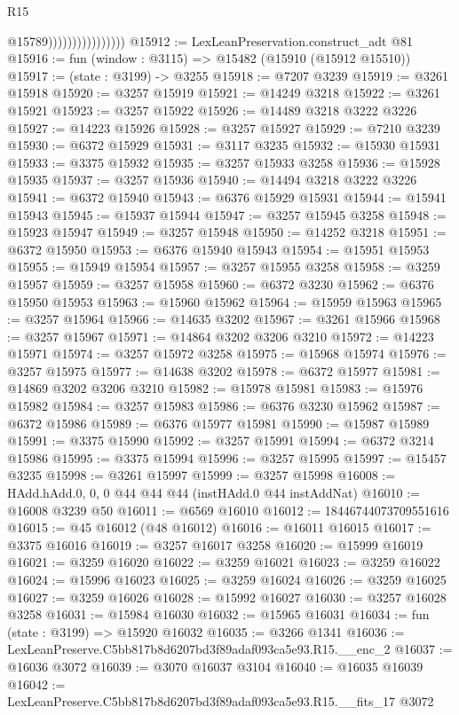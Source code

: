 \begin{lexlean}{R15}
\begin{coremodule}
                                    @15789))))))))))))))))
@15912 := LexLeanPreservation.construct_adt @81
@15916 := fun (window : @3115) => @15482 (@15910 (@15912 @15510))
@15917 := (state : @3199) -> @3255
@15918 := @7207 @3239
@15919 := @3261 @15918
@15920 := @3257 @15919
@15921 := @14249 @3218
@15922 := @3261 @15921
@15923 := @3257 @15922
@15926 := @14489 @3218 @3222 @3226
@15927 := @14223 @15926
@15928 := @3257 @15927
@15929 := @7210 @3239
@15930 := @6372 @15929
@15931 := @3117 @3235
@15932 := @15930 @15931
@15933 := @3375 @15932
@15935 := @3257 @15933 @3258
@15936 := @15928 @15935
@15937 := @3257 @15936
@15940 := @14494 @3218 @3222 @3226
@15941 := @6372 @15940
@15943 := @6376 @15929 @15931
@15944 := @15941 @15943
@15945 := @15937 @15944
@15947 := @3257 @15945 @3258
@15948 := @15923 @15947
@15949 := @3257 @15948
@15950 := @14252 @3218
@15951 := @6372 @15950
@15953 := @6376 @15940 @15943
@15954 := @15951 @15953
@15955 := @15949 @15954
@15957 := @3257 @15955 @3258
@15958 := @3259 @15957
@15959 := @3257 @15958
@15960 := @6372 @3230
@15962 := @6376 @15950 @15953
@15963 := @15960 @15962
@15964 := @15959 @15963
@15965 := @3257 @15964
@15966 := @14635 @3202
@15967 := @3261 @15966
@15968 := @3257 @15967
@15971 := @14864 @3202 @3206 @3210
@15972 := @14223 @15971
@15974 := @3257 @15972 @3258
@15975 := @15968 @15974
@15976 := @3257 @15975
@15977 := @14638 @3202
@15978 := @6372 @15977
@15981 := @14869 @3202 @3206 @3210
@15982 := @15978 @15981
@15983 := @15976 @15982
@15984 := @3257 @15983
@15986 := @6376 @3230 @15962
@15987 := @6372 @15986
@15989 := @6376 @15977 @15981
@15990 := @15987 @15989
@15991 := @3375 @15990
@15992 := @3257 @15991
@15994 := @6372 @3214 @15986
@15995 := @3375 @15994
@15996 := @3257 @15995
@15997 := @15457 @3235
@15998 := @3261 @15997
@15999 := @3257 @15998
@16008 := HAdd.hAdd.{0, 0, 0} @44 @44 @44 (instHAdd.{0} @44 instAddNat)
@16010 := @16008 @3239 @50
@16011 := @6569 @16010
@16012 := 18446744073709551616
@16015 := @45 @16012 (@48 @16012)
@16016 := @16011 @16015
@16017 := @3375 @16016
@16019 := @3257 @16017 @3258
@16020 := @15999 @16019
@16021 := @3259 @16020
@16022 := @3259 @16021
@16023 := @3259 @16022
@16024 := @15996 @16023
@16025 := @3259 @16024
@16026 := @3259 @16025
@16027 := @3259 @16026
@16028 := @15992 @16027
@16030 := @3257 @16028 @3258
@16031 := @15984 @16030
@16032 := @15965 @16031
@16034 := fun (state : @3199) => @15920 @16032
@16035 := @3266 @1341
@16036 := LexLeanPreserve.C5bb817b8d6207bd3f89adaf093ca5e93.R15.__enc_2
@16037 := @16036 @3072
@16039 := @3070 @16037 @3104
@16040 := @16035 @16039
@16042 := LexLeanPreserve.C5bb817b8d6207bd3f89adaf093ca5e93.R15.__fits_17 @3072

\end{coremodule}
\end{lexlean}
